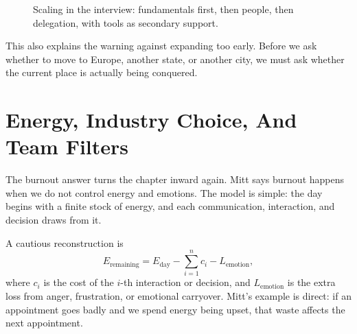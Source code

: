 \begin{figure}
\centering
{}
\caption{Scaling in the interview: fundamentals first, then people, then delegation, with tools as secondary support.}
\end{figure}

This also explains the warning against expanding too early. Before we ask whether to move to Europe, another state, or another city, we must ask whether the current place is actually being conquered.

\section{Energy, Industry Choice, And Team Filters}

The burnout answer turns the chapter inward again. Mitt says burnout happens when we do not control energy and emotions. The model is simple: the day begins with a finite stock of energy, and each communication, interaction, and decision draws from it.

A cautious reconstruction is
\begin{equation}
E_{\text{remaining}}
=
E_{\text{day}}
-\sum_{i=1}^{n} c_i
-L_{\text{emotion}},
\end{equation}
where \(c_i\) is the cost of the \(i\)-th interaction or decision, and \(L_{\text{emotion}}\) is the extra loss from anger, frustration, or emotional carryover. Mitt's example is direct: if an appointment goes badly and we spend energy being upset, that waste affects the next appointment.

